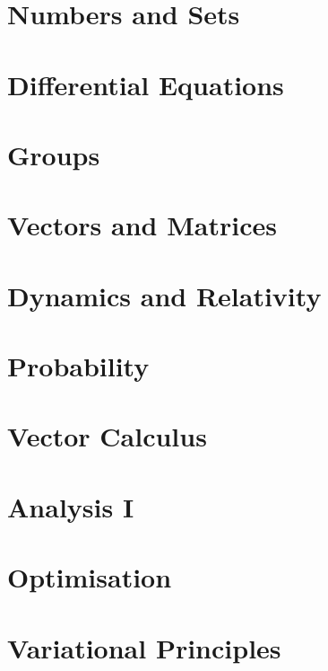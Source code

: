 \documentclass{book}
\begin{document}
\let\maketitle\ignorespaces{}
\renewcommand{\tableofcontentsnewpage}{}

\chapter{Numbers and Sets}

\chapter{Differential Equations}

\chapter{Groups}

\chapter{Vectors and Matrices}

\chapter{Dynamics and Relativity}

\chapter{Probability}

\chapter{Vector Calculus}

\chapter{Analysis I}


\chapter{Optimisation}

\chapter{Variational Principles}

\end{document}
